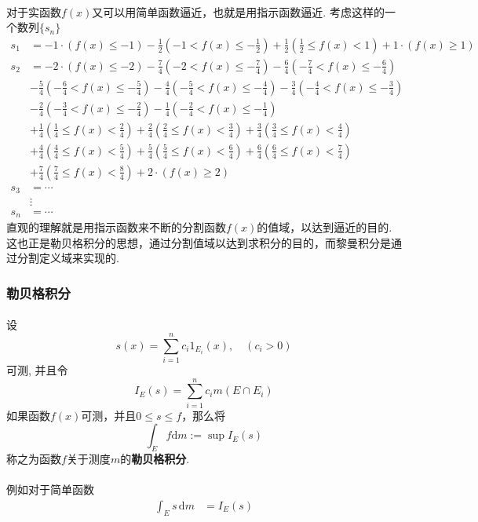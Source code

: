 \paragraph{}
对于实函数$f(x)$又可以用简单函数逼近，也就是用指示函数逼近.  考虑这样的一个数列$\{s_n\}$
\begin{align*}
s_1 &= -1 \cdot (f(x) \leq -1)  -\frac{1}{2} (-1 <  f(x) \leq  -\frac{1}{2}) + \frac{1}{2} (\frac{1}{2} \leq f(x) < 1) + 1 \cdot (f(x) \geq 1) \\
s_2 &= -2 \cdot (f(x) \leq -2) -\frac{7}{4} (-2 < f(x) \leq -\frac{7}{4}) - \frac{6}{4} (-\frac{7}{4} < f(x) \leq -\frac{6}{4}) \\
& - \frac{5}{4}( -\frac{6}{4} < f(x) \leq -\frac{5}{4}) - \frac{4}{4} (-\frac{5}{4} < f(x) \leq -\frac{4}{4}) - \frac{3}{4} ( -\frac{4}{4} < f(x) \leq -\frac{3}{4}) \\
& - \frac{2}{4} (-\frac{3}{4} < f(x) \leq -\frac{2}{4}) - \frac{1}{4}(-\frac{2}{4} < f(x) \leq -\frac{1}{4})  \\
& +\frac{1}{4} (\frac{1}{4} \leq f(x) < \frac{2}{4}) + \frac{2}{4} (\frac{2}{4} \leq f(x) < \frac{3}{4}) + \frac{3}{4} (\frac{3}{4} \leq f(x) < \frac{4}{4}) \\
& + \frac{4}{4} (\frac{4}{4} \leq f(x) < \frac{5}{4}) + \frac{5}{4} (\frac{5}{4} \leq f(x) < \frac{6}{4}) + \frac{6}{4} (\frac{6}{4} \leq f(x) < \frac{7}{4}) \\
& + \frac{7}{4} (\frac{7}{4} \leq f(x) < \frac{8}{4}) + 2\cdot (f(x) \geq 2) \\
s_3 & = \cdots \\
& \vdots \\
s_n & = \cdots 
\end{align*}
直观的理解就是用指示函数来不断的分割函数$f(x)$的值域，以达到逼近的目的. 这也正是勒贝格积分的思想，通过分割值域以达到求积分的目的，而黎曼积分是通过分割定义域来实现的.

\subsubsection{勒贝格积分}
\paragraph{}
设
$$
s(x) = \sum_{i=1}^n c_i 1_{E_i}(x), \quad (c_i > 0)
$$
可测, 并且令
$$
I_E(s) = \sum_{i=1}^n c_i m(E\cap E_i)
$$
如果函数$f(x)$可测，并且$0 \leq s \leq f$，那么将
$$
\int_E f \mathrm{d} m := \sup I_E(s)
$$
称之为函数$f$关于测度$m$的\textbf{勒贝格积分}. 

\paragraph{}
例如对于简单函数
\begin{align*}
\int_E s\, \mathrm{d} m & = I_E(s)
\end{align*}



